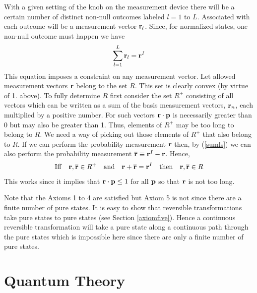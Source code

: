 \documentclass[12pt]{article}
\begin{document}
With a given setting of the knob on the measurement device there will be
a certain number of distinct non-null outcomes labeled $l=1$ to $L$.
Associated with each outcome will be a measurement vector ${\bf r}_l$.
Since, for normalized states, one non-null outcome must happen we have
\begin{equation}\label{sumls}
\sum_{l=1}^L {\bf r}_l = {\bf r}^I
\end{equation}
This equation imposes a constraint on any measurement vector. Let
allowed measurement vectors ${\bf r}$ belong to the set $R$. This
set is
clearly convex (by virtue of 1. above).  To fully determine $R$ first
consider the set $R^+$ consisting of all vectors which can be written
as a sum of the basis measurement vectors, ${\bf r}_n$,
each multiplied by a positive number. For
such vectors ${\bf r}\cdot{\bf p}$ is necessarily greater than 0 but may
also be greater than 1.  Thus, elements of $R^+$ may be too long to
belong to $R$.  We need a way of picking out those
elements of $R^+$ that also belong to $R$. If we can perform the
probability measurement ${\bf r}$ then, by (\ref{sumls})
we can also perform the probability measurement
$\overline{\bf r}\equiv {\bf r}^I - {\bf r}$. Hence,
\begin{equation}
{\rm Iff} \quad {\bf r},\overline{\bf r}\in R^+ \quad {\rm and} \quad
{\bf r}+\overline{\bf r}={\bf r}^I \quad{\rm then}\quad {\bf r},\overline{\bf r}\in R
\end{equation}
This works since it implies that ${\bf r}\cdot{\bf p} \leq 1$ for all ${\bf
p}$ so that ${\bf r}$ is not too long.

Note that the Axioms 1 to 4 are satisfied but Axiom 5 is not since there
are a finite number of pure states.  It is easy to show that reversible
transformations take pure states to pure states (see Section
\ref{axiomfive}). Hence a continuous reversible transformation will take
a pure state along a continuous path through the pure states which is
impossible here since there are only a finite number of pure states.


\section{Quantum Theory}\label{qtheory}
\end{document}
